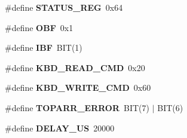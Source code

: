 \begin{DoxyCompactItemize}
\mbox{\label{group__KBD_ga1f7e79cfe81dc06414550fa52418941e}} 
\#define {\bfseries S\+T\+A\+T\+U\+S\+\_\+\+R\+EG}~0x64
\item 
\mbox{\label{group__KBD_ga45967c9e25447ba853cf6fb4ac545fe6}} 
\#define {\bfseries O\+BF}~0x1
\item 
\mbox{\label{group__KBD_ga3c48b10907056351582baf9f6478598e}} 
\#define {\bfseries I\+BF}~B\+IT(1)
\item 
\mbox{\label{group__KBD_gaba099f461fff0a69b50ed2966d6700e9}} 
\#define {\bfseries K\+B\+D\+\_\+\+R\+E\+A\+D\+\_\+\+C\+MD}~0x20
\item 
\mbox{\label{group__KBD_gaafe9e5d0faf5f1fdd997c84921198a0a}} 
\#define {\bfseries K\+B\+D\+\_\+\+W\+R\+I\+T\+E\+\_\+\+C\+MD}~0x60
\item 
\mbox{\label{group__KBD_ga012b0819c8e122c653b065f892a974af}} 
\#define {\bfseries T\+O\+P\+A\+R\+R\+\_\+\+E\+R\+R\+OR}~B\+IT(7) $\vert$ B\+IT(6)
\item 
\mbox{\label{group__KBD_ga1a522aa19bcb695a9df30032a893bee3}} 
\#define {\bfseries D\+E\+L\+A\+Y\+\_\+\+US}~20000
\end{DoxyCompactItemize}
